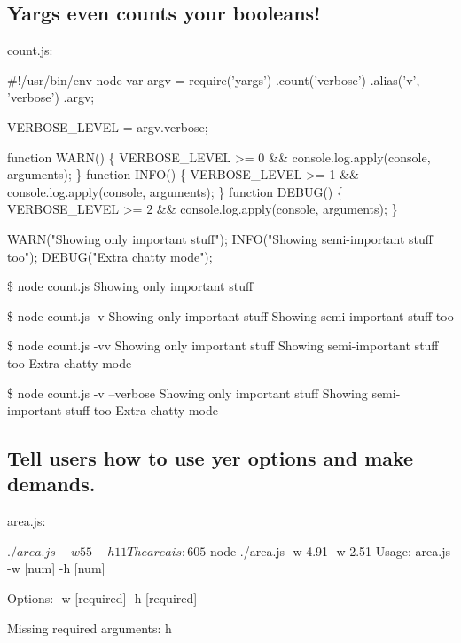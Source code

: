 \subsection*{Yargs even counts your booleans! }

count.\+js\+:


\begin{DoxyCode}
#!/usr/bin/env node
var argv = require('yargs')
    .count('verbose')
    .alias('v', 'verbose')
    .argv;

VERBOSE\_LEVEL = argv.verbose;

function WARN()  \{ VERBOSE\_LEVEL >= 0 && console.log.apply(console, arguments); \}
function INFO()  \{ VERBOSE\_LEVEL >= 1 && console.log.apply(console, arguments); \}
function DEBUG() \{ VERBOSE\_LEVEL >= 2 && console.log.apply(console, arguments); \}

WARN("Showing only important stuff");
INFO("Showing semi-important stuff too");
DEBUG("Extra chatty mode");
\end{DoxyCode}




 \$ node count.\+js Showing only important stuff

\$ node count.\+js -\/v Showing only important stuff Showing semi-\/important stuff too

\$ node count.\+js -\/vv Showing only important stuff Showing semi-\/important stuff too Extra chatty mode

\$ node count.\+js -\/v --verbose Showing only important stuff Showing semi-\/important stuff too Extra chatty mode

\subsection*{Tell users how to use yer options and make demands. }

area.\+js\+:






 \begin{DoxyVerb}$ ./area.js -w 55 -h 11
The area is: 605

$ node ./area.js -w 4.91 -w 2.51
Usage: area.js -w [num] -h [num]

Options:
  -w  [required]
  -h  [required]

Missing required arguments: h
\end{DoxyVerb}


